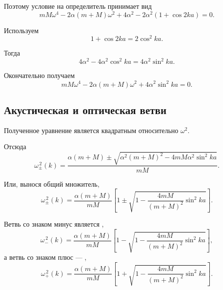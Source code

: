\documentclass[../final.tex]{subfiles}
\begin{document}
Поэтому условие на определитель принимает вид
%
\begin{equation*}
    mM\omega^4
    -
    2\alpha(m+M)\omega^2
    +
    4\alpha^2
    -
    2\alpha^2
    \left(
        1+\cos 2ka
    \right)
    =
    0.
\end{equation*}
%

Используем
%
\begin{equation*}
    1+\cos2ka
    =
    2\cos^2ka.
\end{equation*}
%

Тогда
%
\begin{equation*}
    4\alpha^2
    -
    4\alpha^2\cos^2ka
    =
    4\alpha^2\sin^2ka.
\end{equation*}
%

Окончательно получаем
%
\begin{equation*}
    mM\omega^4
    -
    2\alpha(m+M)\omega^2
    +
    4\alpha^2\sin^2ka
    =
    0.
\end{equation*}



\subsection*{Акустическая и оптическая ветви}

Полученное уравнение является квадратным
относительно $\omega^2$.

Отсюда
%
\begin{equation*}
    \omega_{\pm}^{\,2}(k)
    =
    \frac{
        \alpha(m+M)
        \pm
        \sqrt{
            \alpha^2(m+M)^2
            -
            4mM\alpha^2\sin^2ka
        }
    }{
        mM
    }.
\end{equation*}
%

Или, вынося общий множитель,
%
\begin{equation*}
    \omega_{\pm}^{\,2}(k)
    =
    \frac{\alpha(m+M)}{mM}
    \left[
        1
        \pm
        \sqrt{
            1
            -
            \frac{4mM}{(m+M)^2}
            \sin^2ka
        }
    \right].
\end{equation*}
%

Ветвь со знаком минус является
,
%
\begin{equation*}
    \omega_-^{\,2}(k)
    =
    \frac{\alpha(m+M)}{mM}
    \left[
        1
        -
        \sqrt{
            1
            -
            \frac{4mM}{(m+M)^2}
            \sin^2ka
        }
    \right],
\end{equation*}
%
а ветвь со знаком плюс ---
,
%
\begin{equation*}
    \omega_+^{\,2}(k)
    =
    \frac{\alpha(m+M)}{mM}
    \left[
        1
        +
        \sqrt{
            1
            -
            \frac{4mM}{(m+M)^2}
            \sin^2ka
        }
    \right].
\end{equation*}
\end{document}
